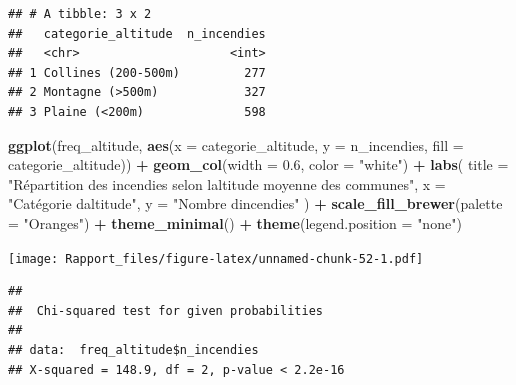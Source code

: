 \documentclass[
]{article}
\newenvironment{Shaded}{\begin{snugshade}}{\end{snugshade}}
\newcommand{\AttributeTok}[1]{\textcolor[rgb]{0.13,0.29,0.53}{#1}}
\newcommand{\ControlFlowTok}[1]{\textcolor[rgb]{0.13,0.29,0.53}{\textbf{#1}}}
\newcommand{\DecValTok}[1]{\textcolor[rgb]{0.00,0.00,0.81}{#1}}
\newcommand{\FloatTok}[1]{\textcolor[rgb]{0.00,0.00,0.81}{#1}}
\newcommand{\FunctionTok}[1]{\textcolor[rgb]{0.13,0.29,0.53}{\textbf{#1}}}
\newcommand{\NormalTok}[1]{#1}
\newcommand{\OtherTok}[1]{\textcolor[rgb]{0.56,0.35,0.01}{#1}}
\newcommand{\SpecialCharTok}[1]{\textcolor[rgb]{0.81,0.36,0.00}{\textbf{#1}}}
\newcommand{\StringTok}[1]{\textcolor[rgb]{0.31,0.60,0.02}{#1}}
\begin{document}
\begin{verbatim}
## # A tibble: 3 x 2
##   categorie_altitude  n_incendies
##   <chr>                     <int>
## 1 Collines (200-500m)         277
## 2 Montagne (>500m)            327
## 3 Plaine (<200m)              598
\end{verbatim}

\begin{Shaded}
\begin{Highlighting}[]
\FunctionTok{ggplot}\NormalTok{(freq\_altitude, }\FunctionTok{aes}\NormalTok{(}\AttributeTok{x =}\NormalTok{ categorie\_altitude, }\AttributeTok{y =}\NormalTok{ n\_incendies, }\AttributeTok{fill =}\NormalTok{ categorie\_altitude)) }\SpecialCharTok{+}
  \FunctionTok{geom\_col}\NormalTok{(}\AttributeTok{width =} \FloatTok{0.6}\NormalTok{, }\AttributeTok{color =} \StringTok{"white"}\NormalTok{) }\SpecialCharTok{+}
  \FunctionTok{labs}\NormalTok{(}
    \AttributeTok{title =} \StringTok{"Répartition des incendies selon l\textquotesingle{}altitude moyenne des communes"}\NormalTok{,}
    \AttributeTok{x =} \StringTok{"Catégorie d\textquotesingle{}altitude"}\NormalTok{,}
    \AttributeTok{y =} \StringTok{"Nombre d\textquotesingle{}incendies"}
\NormalTok{  ) }\SpecialCharTok{+}
  \FunctionTok{scale\_fill\_brewer}\NormalTok{(}\AttributeTok{palette =} \StringTok{"Oranges"}\NormalTok{) }\SpecialCharTok{+}
  \FunctionTok{theme\_minimal}\NormalTok{() }\SpecialCharTok{+}
  \FunctionTok{theme}\NormalTok{(}\AttributeTok{legend.position =} \StringTok{"none"}\NormalTok{)}
\end{Highlighting}
\end{Shaded}

\texttt{[image: Rapport\_files/figure-latex/unnamed-chunk-52-1.pdf]}

\begin{Shaded}
\end{Shaded}

\begin{verbatim}
## 
##  Chi-squared test for given probabilities
## 
## data:  freq_altitude$n_incendies
## X-squared = 148.9, df = 2, p-value < 2.2e-16
\end{verbatim}
\end{document}
